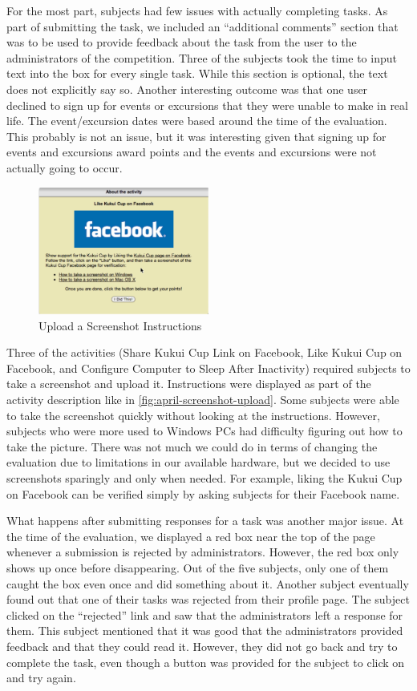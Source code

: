 For the most part, subjects had few issues with actually completing tasks. As part of submitting the task, we included an ``additional comments'' section that was to be used to provide feedback about the task from the user to the administrators of the competition. Three of the subjects took the time to input text into the box for every single task. While this section is optional, the text does not explicitly say so. Another interesting outcome was that one user declined to sign up for events or excursions that they were unable to make in real life. The event/excursion dates were based around the time of the evaluation. This probably is not an issue, but it was interesting given that signing up for events and excursions award points and the events and excursions were not actually going to occur.

\begin{figure}[t]
    \center
    \includegraphics[width=0.5\textwidth]{images/april-screenshot-upload.eps}
    \caption{Upload a Screenshot Instructions}
    \label{fig:april-screenshot-upload}
\end{figure}

Three of the activities (Share Kukui Cup Link on Facebook, Like Kukui Cup on Facebook, and Configure Computer to Sleep After Inactivity) required subjects to take a screenshot and upload it. Instructions were displayed as part of the activity description like in \autoref{fig:april-screenshot-upload}. Some subjects were able to take the screenshot quickly without looking at the instructions. However, subjects who were more used to Windows PCs had difficulty figuring out how to take the picture. There was not much we could do in terms of changing the evaluation due to limitations in our available hardware, but we decided to use screenshots sparingly and only when needed. For example, liking the Kukui Cup on Facebook can be verified simply by asking subjects for their Facebook name.

What happens after submitting responses for a task was another major issue. At the time of the evaluation, we displayed a red box near the top of the page whenever a submission is rejected by administrators. However, the red box only shows up once before disappearing. Out of the five subjects, only one of them caught the box even once and did something about it. Another subject eventually found out that one of their tasks was rejected from their profile page. The subject clicked on the ``rejected'' link and saw that the administrators left a response for them. This subject mentioned that it was good that the administrators provided feedback and that they could read it. However, they did not go back and try to complete the task, even though a button was provided for the subject to click on and try again.

